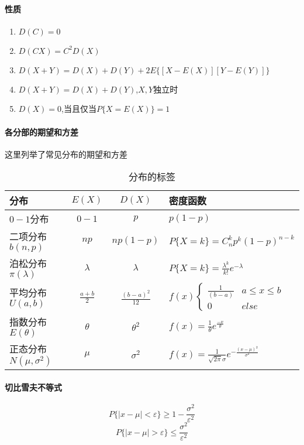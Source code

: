 \documentclass[12pt]{report}
\begin{document}
\paragraph{性质}
\begin{enumerate}
    \item $D(C)=0$
    \item $D(CX)=C^2D(X)$
    \item $D(X+Y)=D(X)+D(Y)+2E\{[X-E(X)][Y-E(Y)]\}$
    \item $D(X+Y)=D(X)+D(Y)$,\quad $X,Y$独立时
    \item $D(X)=0$,\quad 当且仅当\quad $P\{X=E(X)\}=1$
\end{enumerate}
\newpage
\paragraph{各分部的期望和方差} 这里列举了常见分布的期望和方差\par
\begin{table}[hbp]
    \begin{center}
        \begin{tabular}{lccl}
        \hline
        分布 &$E(X)$ &$D(X)$ &密度函数\\
        \hline
        $0-1$分布 &$0-1$ &$p$ &$p(1-p)$\\
        二项分布$b(n,p)$ &$np$ &$np(1-p)$ &$P\{X=k\}=C_n^kp^k(1-p)^{n-k}$\\
        泊松分布$\pi(\lambda)$ &$\lambda$ &$\lambda$ &$P\{X=k\}=\frac{\lambda ^k}{k!} e^{-\lambda}$\\
        平均分布$U(a,b)$ &$\frac{a+b}{2}$&$\frac{(b-a)^2}{12}$ &$f(x)\begin{cases}\frac{1}{(b-a)}&a\leq x\leq b\\0&else\end{cases}$\\
        指数分布$E(\theta)$&$\theta$&$\theta^2$&$f(x)=\frac{1}{\theta}e^{\frac{-x}{\theta}}$\\
        正态分布$N(\mu,\sigma ^2)$&$\mu$&$\sigma ^2$&$f(x)=\frac{1}{\sqrt{2\pi}\sigma}e^{-\frac{(x-\mu)^2}{\sigma ^2}}$\\
        \hline
        \end{tabular}
    \end{center}
    \caption{分布的标签}
\end{table}
\paragraph{切比雪夫不等式}
\begin{equation}
    P\{|x-\mu|<\varepsilon\}\geqslant 1-\frac{\sigma ^2}{\varepsilon ^2}
    \label{切比雪夫不等式下界}
\end{equation}
\begin{equation}
    P\{|x-\mu|>\varepsilon\}\leqslant \frac{\sigma ^2}{\varepsilon ^2}
    \label{切比雪夫不等式上界}
\end{equation}
\end{document}
